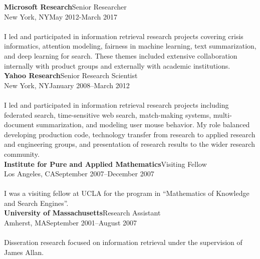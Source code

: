 \documentclass{article}
\begin{document}
\noindent\textbf{Microsoft Research}\hfill Senior Researcher\\
New York, NY\hfill May 2012-March 2017\\\\
I led and participated in information retrieval research projects covering crisis informatics,  attention modeling, fairness in machine learning, text summarization, and deep learning for search.  These themes included extensive collaboration internally with product groups and externally with academic institutions. \\

\noindent\textbf{Yahoo Research}\hfill Senior Research Scientist\\
New York, NY\hfill January 2008–March 2012\\\\
I led and participated in information retrieval research projects including federated search, time-sensitive web search, match-making systems, multi-document summarization, and modeling user mouse behavior.  My role balanced developing production code, technology transfer from research to applied research and engineering groups, and presentation of research results to the wider research community.  \\


\noindent\textbf{Institute for Pure and Applied Mathematics}\hfill Visiting Fellow\\
Los Angeles, CA\hfill September 2007–December 2007\\\\
I was a visiting fellow at UCLA for the program in ``Mathematics of Knowledge and Search Engines''.\\

\noindent\textbf{University of Massachusetts}\hfill Research Assistant\\
Amherst, MA\hfill  September 2001–August 2007\\\\
Disseration research focused on information retrieval under the supervision of James Allan.\\
%
\end{document}
